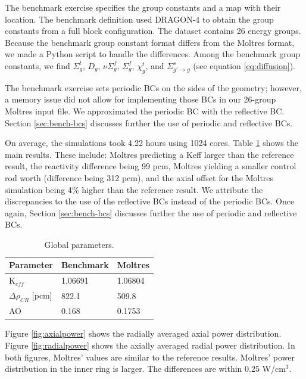 The benchmark exercise specifies the group constants and a map with their location.
The benchmark definition used DRAGON-4 \cite{marleau_user_2016} to obtain the group constants from a full block configuration.
The dataset contains 26 energy groups.
Because the benchmark group constant format differs from the Moltres format, we made a Python script to handle the differences.
Among the benchmark group constants, we find $\Sigma_g^t$, $D_g$, $\nu\Sigma_g^f$, $\Sigma_g^f$, $\chi_g^t$, and $\Sigma_{g'\rightarrow g}^s$ (see equation \ref{eq:diffusion}).

The benchmark exercise sets periodic \glspl{BC} on the sides of the geometry; however, a memory issue did not allow for implementing those BCs in our 26-group Moltres input file.
We approximated the periodic BC with the reflective BC.
Section \ref{sec:bench-bcs} discusses further the use of periodic and reflective BCs.

On average, the simulations took 4.22 hours using 1024 cores.
Table \ref{tab:globalparam} shows the main results.
These include: Moltres predicting a \gls{Keff} larger than the reference result, the reactivity difference being 99 pcm, Moltres yielding a smaller control rod worth (difference being 312 pcm), and the axial offset for the Moltres simulation being 4$\%$ higher than the reference result.
We attribute the discrepancies to the use of the reflective BCs instead of the periodic BCs.
Once again, Section \ref{sec:bench-bcs} discusses further the use of periodic and reflective BCs.

\begin{table}[htbp!]
  \centering
  \caption{Global parameters.}
  \begin{tabular}{l|l|l}
  \toprule
  Parameter 	&  Benchmark  &  Moltres    \\
  \midrule
  K$_{eff}$ 	&  1.06691    &  1.06804    \\
  $\Delta \rho_{CR}$ [pcm]  & 822.1 	& 509.8 \\
  AO        	&  0.168      &  0.1753     \\
  \bottomrule
  \end{tabular}
  \label{tab:globalparam}
\end{table}

Figure \ref{fig:axialpower} shows the radially averaged axial power distribution.
Figure \ref{fig:radialpower} shows the axially averaged radial power distribution.
In both figures, Moltres' values are similar to the reference results.
Moltres' power distribution in the inner ring is larger.
The differences are within 0.25 W/cm$^3$.

